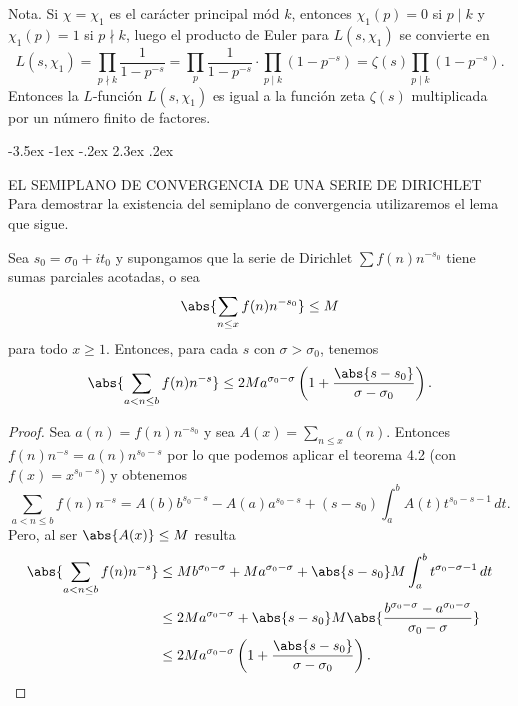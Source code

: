 \documentclass[12pt,a4paper]{book}
\makeatletter
\renewcommand\section{\@startsection{section}{1}{\z@}%
  {-3.5ex \@plus -1ex \@minus -.2ex}%
  {2.3ex \@plus .2ex}%
  {\normalfont\Large\bfseries\raggedright}}
\makeatother
\begin{document}
    Nota. Si $\chi=\chi_{1}$ es el carácter principal mód $k$, entonces $\chi_{1}(p)=0$ si $p\mid k$
    y $\chi_{1}(p)=1$ si $p\nmid k$, luego el producto de Euler para $L(s,\chi_{1})$ se convierte
    en
    \begin{equation*}
        L(s,\chi_{1})=\prod_{p\nmid k}\frac{1}{1-p^{-s}}=\prod_{p}\frac{1}{1-p^{-s}}\cdot\prod_{p\mid k}(1-p^{-s})=\zeta(s)\prod_{p\mid k}(1-p^{-s}).
    \end{equation*}
    Entonces la $L$-función $L(s,\chi_{1})$ es igual a la función zeta $\zeta(s)$ multiplicada
    por un número finito de factores.

    \section{EL SEMIPLANO DE CONVERGENCIA DE UNA SERIE DE DIRICHLET}\label{sim:sigc}
    Para demostrar la existencia del semiplano de convergencia utilizaremos el lema que
    sigue.

    \begin{lema}\label{lem:11-2}
        Sea $s_{0}=\sigma_{0}+it_{0}$ y supongamos que la serie de Dirichlet $\sum f(n)n^{-s_{0}}$
        tiene sumas parciales acotadas, o sea
        \begin{equation*}
            \abs{\sum_{n\leq x}f(n)n^{-s_{0}}}\leq M
        \end{equation*}
        para todo $x\geq1$. Entonces, para cada $s$ con $\sigma>\sigma_{0}$, tenemos
        \begin{equation}\label{eq:11-9}
            \abs{\sum_{a<n\leq b}f(n)n^{-s}}\leq2Ma^{\sigma_{0}-\sigma}\left(1+\frac{\abs{s-s_{0}}}{\sigma-\sigma_{0}}\right).
        \end{equation}
    \end{lema}

    \begin{proof}
        Sea $a(n)=f(n)n^{-s_{0}}$ y sea $A(x)=\sum_{n\leq x}a(n)$. Entonces
        $f(n)n^{-s}=a(n)n^{s_{0}-s}$ por lo que podemos aplicar el teorema 4.2 (con
        $f(x)=x^{s_{0}-s}$) y obtenemos
        \begin{equation*}
            \sum_{a<n\leq b}f(n)n^{-s}=A(b)b^{s_{0}-s}-A(a)a^{s_{0}-s}+(s-s_{0})\int_{a}^{b}A(t)t^{s_{0}-s-1}\,dt.
        \end{equation*}
        Pero, al ser $\abs{A(x)}\leq M$ resulta
        \begin{align*}
            \abs{\sum_{a<n\leq b}f(n)n^{-s}}&\leq Mb^{\sigma_{0}-\sigma}+Ma^{\sigma_{0}-\sigma}+\abs{s-s_{0}}M\int_{a}^{b}t^{\sigma_{0}-\sigma-1}\,dt\\
            &\leq2Ma^{\sigma_{0}-\sigma}+\abs{s-s_{0}}M\abs{\frac{b^{\sigma_{0}-\sigma}-a^{\sigma_{0}-\sigma}}{\sigma_{0}-\sigma}}\\
            &\leq2Ma^{\sigma_{0}-\sigma}\left(1+\frac{\abs{s-s_{0}}}{\sigma-\sigma_{0}}\right).\qedhere
        \end{align*}
    \end{proof}
\end{document}
